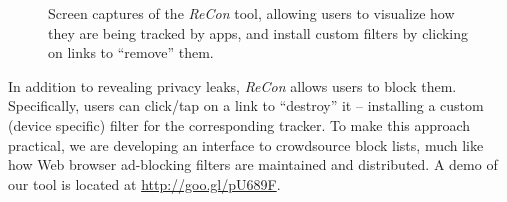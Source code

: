 \begin{figure}[tb]
\hspace{0.1in}
\caption{Screen captures of the \emph{ReCon} tool, allowing users to visualize how they are being tracked by apps, and install custom filters by clicking on links to ``remove'' them. }
\label{fig:recon}
\vspace{\postfigspace}
\end{figure}

In addition to revealing privacy leaks, \emph{ReCon} allows users to block them. 
Specifically, users can click/tap on a link to ``destroy'' it -- installing a  custom (device specific) filter for the corresponding tracker. 
 
To make this approach practical, we are developing an interface to crowdsource block lists, much like how Web browser ad-blocking filters are maintained and distributed. 
A demo of our tool is located at \url{http://goo.gl/pU689F}. 

